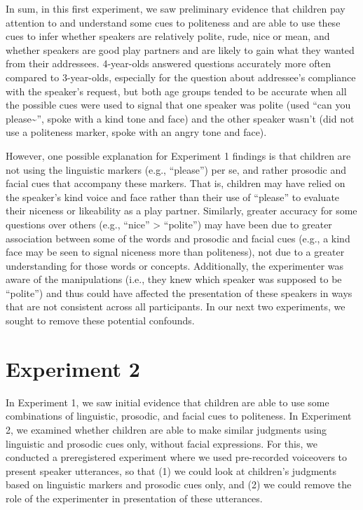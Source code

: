 \documentclass[10pt, letterpaper]{article}
\begin{document}
In sum, in this first experiment, we saw preliminary evidence that
children pay attention to and understand some cues to politeness and are
able to use these cues to infer whether speakers are relatively polite,
rude, nice or mean, and whether speakers are good play partners and are
likely to gain what they wanted from their addressees. 4-year-olds
answered questions accurately more often compared to 3-year-olds,
especially for the question about addressee's compliance with the
speaker's request, but both age groups tended to be accurate when all
the possible cues were used to signal that one speaker was polite (used
``can you please\textasciitilde{}'', spoke with a kind tone and face)
and the other speaker wasn't (did not use a politeness marker, spoke
with an angry tone and face).

However, one possible explanation for Experiment 1 findings is that
children are not using the linguistic markers (e.g., ``please'') per se,
and rather prosodic and facial cues that accompany these markers. That
is, children may have relied on the speaker's kind voice and face rather
than their use of ``please'' to evaluate their niceness or likeability
as a play partner. Similarly, greater accuracy for some questions over
others (e.g., ``nice'' \textgreater{} ``polite'') may have been due to
greater association between some of the words and prosodic and facial
cues (e.g., a kind face may be seen to signal niceness more than
politeness), not due to a greater understanding for those words or
concepts. Additionally, the experimenter was aware of the manipulations
(i.e., they knew which speaker was supposed to be ``polite'') and thus
could have affected the presentation of these speakers in ways that are
not consistent across all participants. In our next two experiments, we
sought to remove these potential confounds.

\section{Experiment 2}\label{experiment-2}

In Experiment 1, we saw initial evidence that children are able to use
some combinations of linguistic, prosodic, and facial cues to
politeness. In Experiment 2, we examined whether children are able to
make similar judgments using linguistic and prosodic cues only, without
facial expressions. For this, we conducted a preregistered experiment
where we used pre-recorded voiceovers to present speaker utterances, so
that (1) we could look at children's judgments based on linguistic
markers and prosodic cues only, and (2) we could remove the role of the
experimenter in presentation of these utterances.
\end{document}
